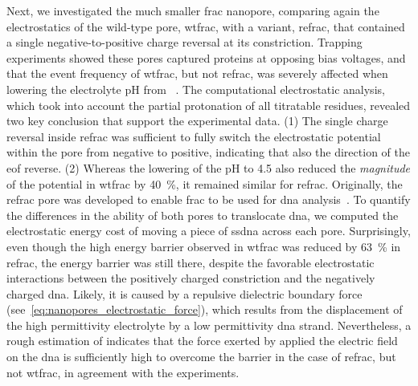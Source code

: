 Next, we investigated the much smaller \gls{frac} nanopore, comparing again the electrostatics of the
wild-type pore, \gls{wtfrac}, with a variant, \gls{refrac}, that contained a single negative-to-positive
charge reversal at its constriction. Trapping experiments showed these pores captured proteins at opposing
bias voltages, and that the event frequency of \gls{wtfrac}, but not \gls{refrac}, was severely affected when
lowering the electrolyte pH from ~\cite{Huang-2017}. The computational electrostatic
analysis, which took into account the partial protonation of all titratable residues, revealed two key
conclusion that support the experimental data. (1) The single charge reversal inside \gls{refrac} was
sufficient to fully switch the electrostatic potential within the pore \lumen{} from negative to positive,
indicating that also the direction of the \gls{eof} reverse. (2) Whereas the lowering of the pH to 4.5 also
reduced the \emph{magnitude} of the potential in \gls{wtfrac} by \SI{40}{\percent}, it remained similar for
\gls{refrac}. Originally, the \gls{refrac} pore was developed to enable \gls{frac} to be used for \gls{dna}
analysis~\cite{Wloka-2016}. To quantify the differences in the ability of both pores to translocate \gls{dna},
we computed the electrostatic energy cost of moving a piece of \gls{ssdna} across each pore. Surprisingly,
even though the high energy barrier observed in \gls{wtfrac} was reduced by \SI{63}{\percent} in \gls{refrac},
the energy barrier was still there, despite the favorable electrostatic interactions between the positively
charged constriction and the negatively charged \gls{dna}. Likely, it is caused by a repulsive dielectric
boundary force (see~\cref{eq:nanopores_electrostatic_force}), which results from the displacement of the high
permittivity electrolyte by a low permittivity \gls{dna} strand. Nevertheless, a rough estimation of
indicates that the force exerted by applied the electric field on the \gls{dna} is sufficiently high to
overcome the barrier in the case of \gls{refrac}, but not \gls{wtfrac}, in agreement with the experiments.

